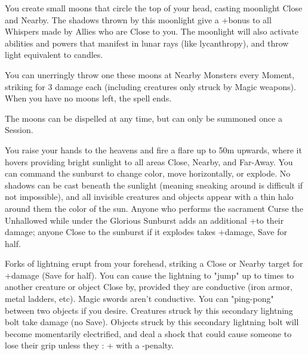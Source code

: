 {\newpage

\MYSTERY [
  Name = Children of Shul,
  Link = arcana-mystery-children-of-shul,
  Paradigm = Prophesy,
  Save = Y (half),
  Duration = Session,
  Target = Self
]

You create \DICE small moons that circle the top of your head, casting moonlight Close and Nearby.  The shadows thrown by this moonlight give a +\DICE bonus to all Whispers made by Allies who are Close to you.  The moonlight will also activate abilities and powers that manifest in lunar rays (like lycanthropy), and throw light equivalent to \DICE candles.

You can unerringly throw one these moons at Nearby Monsters every Moment, striking for 3 damage each (including creatures only struck by Magic weapons).  When you have no moons left, the spell ends.

The moons can be dispelled at any time, but can only be summoned once a Session.

\MYSTERY [
  Name = Glorious Sunburst,
  Link = arcana-mystery-glorious-sunburst,
  Paradigm = Elements,
  Save = Y (half),
  Duration = Combat or \SUM Minutes,
  Target = See Below
]

You raise your hands to the heavens and fire a flare up to 50m upwards, where it hovers providing bright sunlight to all areas Close, Nearby, and Far-Away.  You can command the sunburst to change color, move horizontally, or explode.  No shadows can be cast beneath the sunlight (meaning sneaking around is difficult if not impossible), and all invisible creatures and objects appear with a thin halo around them the color of the sun.  Anyone who performs the sacrament Curse the Unhallowed while under the Glorious Sunburst adds an additional +\DICE to their damage; anyone Close to the sunburst if it explodes takes \SUMDICE+\DICE damage, Save for half.

\MYSTERY [
  Name = Lightning,
  Link = arcana-mystery-lightning,
  Paradigm = Elements,
  Save = Y (half),
  Duration = Instant,
  Target = Close or Nearby Target(s)
]

Forks of lightning erupt from your forehead, striking a Close or Nearby target for \SUMDICE+\DICE damage (Save for half). You can cause the lightning to "jump" up to  times to another creature or object Close by, provided they are conductive (iron armor, metal ladders, etc).  Magic swords aren't conductive.  You can "ping-pong" between two objects if you desire. Creatures struck by this secondary lightning bolt take \DICE damage (no Save). Objects struck by this secondary lightning bolt will become momentarily electrified, and deal a shock that could cause someone to lose their grip unless they \RO : \VIG + \FOC with a -\DICE penalty.

}
